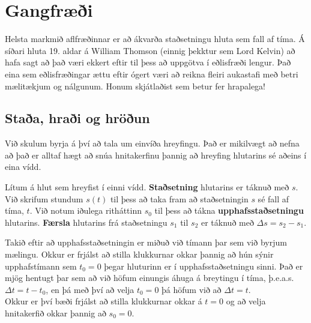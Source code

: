 \chapter{Gangfræði}

Helsta markmið aflfræðinnar er að ákvarða staðsetningu hluta sem fall af tíma. Á síðari hluta 19. aldar á William Thomson (einnig þekktur sem Lord Kelvin) að hafa sagt að það væri ekkert eftir til þess að uppgötva í eðlisfræði lengur. Það eina sem eðlisfræðingar ættu eftir ógert væri að reikna fleiri aukastafi með betri mælitækjum og nálgunum. Honum skjátlaðist sem betur fer hrapalega!

\section{Staða, hraði og hröðun}

Við skulum byrja á því að tala um einvíða hreyfingu. Það er mikilvægt að nefna að það er alltaf hægt að snúa hnitakerfinu þannig að hreyfing hlutarins sé aðeins í eina vídd. 

\begin{tcolorbox}
\begin{definition}
    Lítum á hlut sem hreyfist í einni vídd. \textbf{Staðsetning} hlutarins er táknuð með $s$. Við skrifum stundum $s(t)$ til þess að taka fram að staðsetningin $s$ sé fall af tíma, $t$. Við notum iðulega ritháttinn $s_0$ til þess að tákna \textbf{upphafsstaðsetningu} hlutarins. \textbf{Færsla} hlutarins frá staðsetningu $s_1$ til $s_2$ er táknuð með $\Delta s = s_2 - s_1$. 
\end{definition}
\end{tcolorbox}
Takið eftir að upphafsstaðsetningin er miðuð við tímann þar sem við byrjum mælingu. Okkur er frjálst að stilla klukkurnar okkar þannig að hún sýnir upphafstímann sem $t_0 = 0$ þegar hluturinn er í upphafsstaðsetningu sinni. Það er mjög hentugt þar sem að við höfum einungis áhuga á breytingu í tíma, þ.e.a.s.~$\Delta t = t - t_0$, en þá með því að velja $t_0 = 0$ þá höfum við að $\Delta t = t$. \\

Okkur er því bæði frjálst að stilla klukkurnar okkar á $t = 0$ og að velja hnitakerfið okkar þannig að $s_0 = 0$.\\

